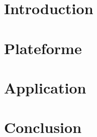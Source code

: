 \documentclass[a4paper, 12pt]{article}
\begin{document}
	


	\tableofcontents
	\newpage	

	\section{Introduction}
	
	\newpage
    
	\section{Plateforme}
	
	\newpage
    
	\section{Application}
	
	\newpage

	\section{Conclusion}
	
	
	
\end{document}
